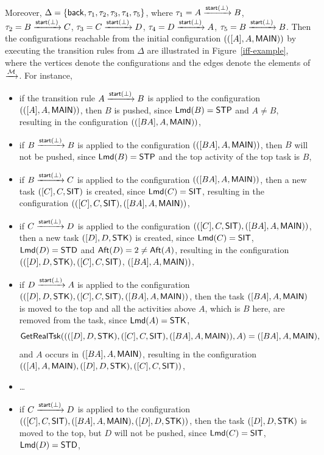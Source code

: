 \begin{example}
Moreover, $\Delta = \{{\mathsf{back} }, \tau_1, \tau_2, \tau_3, \tau_4, \tau_5\}$, where 
        $\tau_1 = A \xrightarrow{{\mathsf{start} }(\bot)} B$,
        $\tau_2 = B \xrightarrow{{\mathsf{start} }(\bot)} C$,
        $\tau_3 = C \xrightarrow{{\mathsf{start} }(\bot)} D$,
        $\tau_4 = D \xrightarrow{{\mathsf{start} }(\bot)} A$,
        $\tau_5 = B \xrightarrow{{\mathsf{start} }(\bot)} B$.
Then the configurations reachable from the initial configuration $(([A], A , {\sf MAIN}))$ by executing the transition rules from $\Delta$ are illustrated in Figure~\ref{iff-example}, where the vertices denote the configurations and the edges denote the elements of $\xrightarrow{{\mathcal{M} }}$. 
For instance, 
\begin{itemize}
\item if the transition rule $A \xrightarrow{{\mathsf{start} }(\bot)} B$ is applied to the configuration $(([A], A , {\sf MAIN}))$, then $B$ is pushed,  since ${\sf Lmd}(B) = {\sf STP}$ and $A \neq B$, resulting in the configuration $(([BA], A , {\sf MAIN}))$,
%
\item if $B \xrightarrow{{\mathsf{start} }(\bot)} B$ is applied to the configuration $(([BA], A, {\sf MAIN}))$, then $B$ will not be pushed, since ${\sf Lmd}(B) = {\sf STP}$ and the top activity of the top task is $B$, 
%
\item if $B \xrightarrow{{\mathsf{start} }(\bot)} C$ is applied to the configuration $(([BA], A, {\sf MAIN}))$, then a new task $([C], C, {\sf SIT})$ is created, since ${\sf Lmd}(C) = {\sf SIT}$, resulting in the configuration $(([C], C, {\sf SIT}), ([BA], A , {\sf MAIN}))$,  
%
\item if $C \xrightarrow{{\mathsf{start} }(\bot)} D$ is applied to the configuration $(([C], C, {\sf SIT}), ([BA], A , {\sf MAIN}))$, then a new task $([D], D, {\sf STK})$ is created, since ${\sf Lmd}(C) = {\sf SIT}$, ${\sf Lmd}(D) = {\sf STD}$ and ${\sf Aft}(D)  = 2 \neq {\sf Aft}(A)$, resulting in the configuration
$(([D], D, {\sf STK}), ([C], C, {\sf SIT})$, $([BA], A , {\sf MAIN}))$, 
%
\item if $D \xrightarrow{{\mathsf{start} }(\bot)} A$ is applied to the configuration $(([D], D, {\sf STK}), ([C], C, {\sf SIT}), ([BA], A , {\sf MAIN}))$, then the task $([BA], A , {\sf MAIN})$ is moved to the top and all the activities above $A$, which is $B$ here, are removed from the task, since ${\sf Lmd}(A) = {\sf STK}$, 
$$\mathsf{GetRealTsk}((([D], D, {\sf STK}), ([C], C, {\sf SIT}), ([BA], A , {\sf MAIN})), A) = ([BA], A , {\sf MAIN}),$$ 
and $A$ occurs in $([BA], A , {\sf MAIN})$, resulting in the configuration 
$(([A], A , {\sf MAIN}), ([D], D, {\sf STK}), ([C], C, {\sf SIT}))$, 
%
\item \dots
%
\item if $C \xrightarrow{{\mathsf{start} }(\bot)} D$ is applied to the configuration $(([C], C, {\sf SIT}), ([BA], A , {\sf MAIN}), ([D], D, {\sf STK}))$, then the task $([D], D, {\sf STK})$ is moved to the top, but $D$ will not be pushed, since ${\sf Lmd}(C) = {\sf SIT}$, ${\sf Lmd}(D) = {\sf STD}$, 

\end{itemize}
\end{example}

